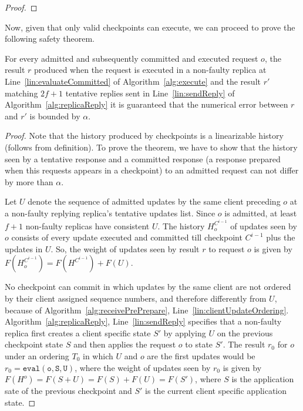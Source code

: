 \documentclass[twocolumn,10pt]{article}
\begin{document}
{\begin{proof}
\end{proof}


Now, given that only valid checkpoints can execute,  
we can proceed to
prove the following safety theorem.

\begin{theorem}[Safety]
\label{thm:safety}
For every admitted and subsequently committed and executed request $o$, the result
$r$ produced when the request is executed in a non-faulty replica at
Line~\ref{lin:evaluateCommitted} of Algorithm~\ref{alg:execute} and the
result $r'$ matching $2f+1$ tentative replies sent in
Line~\ref{lin:sendReply} of Algorithm~\ref{alg:replicaReply} it is guaranteed 
that the numerical error between $r$ and $r'$ is bounded by $\alpha$.
\end{theorem}

\begin{proof}
Note that the history produced by checkpoints is a linearizable history (follows
from definition). To prove the theorem, we have to show that the history 
seen by a tentative response and a committed response (a response prepared when this requests appears 
in a checkpoint) to an admitted request can
not differ by more than $\alpha$.

Let $U$ denote the sequence of admitted updates by the same client
preceding $o$ at a non-faulty replying replica's tentative updates
list. Since $o$ is admitted, at least $f+1$ non-faulty replicas have consistent
$U$.
The history $H_o^{C^{i-1}}$ of updates seen by $o$ consists of every update executed and committed till
checkpoint $C^{i-1}$ plus the updates in $U$. So, the weight of updates
seen by result $r$ to request $o$ is given by $F(H_o^{C^{i-1}}) = F(H^{C^{i-1}}) + F(U)$.


No checkpoint can commit in which updates by the same client are
not ordered by their client assigned sequence numbers, and therefore differently from $U$,
because of Algorithm~\ref{alg:receivePrePrepare},
Line~\ref{lin:clientUpdateOrdering}. Algorithm~\ref{alg:replicaReply},
Line~\ref{lin:sendReply} specifies that a non-faulty replica first creates
a client specific state $S'$ by applying $U$ on the previous checkpoint state
$S$ and then applies the request $o$ to state $S'$. The
result $r_0$ for $o$ under an ordering $T_0$ in which $U$ and $o$ are
the first updates would be $r_0 = \mathtt{eval(o, S, U)}$, where
the weight of updates seen by $r_0$ is given by $F(H^o) = F(S + U) = F(S) + F(U) = F(S')$,
where $S$ is the application sate of the previous checkpoint and $S'$ is the current client 
specific application state.
\fi


\end{proof}}
\end{document}
